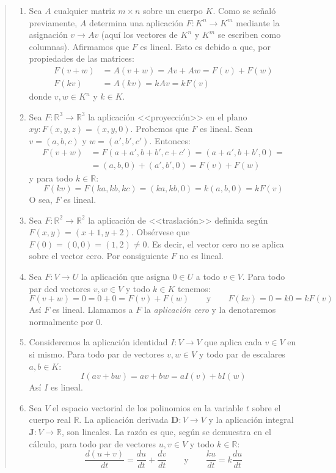 \begin{quote}
  \begin{enumerate}[label=\alph*.]
    \item Sea \(A\) cualquier matriz \(m \times n\) sobre un cuerpo \(K\). Como se señaló previamente, \(A\) determina una aplicación \(F:K^n \rightarrow K^m\) mediante la asignación \(v \rightarrow Av\) (aquí los vectores de \(K^n\) y \(K^m\) se escriben como columnas). Afirmamos que \(F\) es lineal. Esto es debido a que, por propiedades de las matrices:
    \begin{align*}
      F(v + w) &= A(v+w) = Av + Aw = F(v) + F(w) \\
      F(kv) &= A(kv) = kAv = kF(v)
    \end{align*}
    donde \(v, w \in K^n\) y \(k \in K\).
    \item Sea \(F:\mathbb{R}^3 \rightarrow \mathbb{R}^3\) la aplicación <<proyección>> en el plano \(xy: F(x,y,z)= (x,y,0)\). Probemos que \(F\) es lineal. Sean \(v=(a,b,c)\) y \(w=(a',b',c')\). Entonces:
    \begin{align*}
      F(v+w) &= F(a+a', b+b', c+c') = (a+a', b+b',0) = \\
            &= (a,b,0) + (a',b',0) = F(v) + F(w)
    \end{align*}
    y para todo \(k \in \mathbb{R}\):
    \[
      F(kv) = F(ka,kb,kc) = (ka,kb,0) = k(a,b,0) = kF(v)
    \]
    O sea, \(F\) es lineal.
    \item Sea \(F: \mathbb{R}^2 \rightarrow \mathbb{R}^2\) la aplicación de <<traslación>> definida según \(F(x,y) = (x+1,y+2)\). Obsérvese que \(F(0)=(0,0)=(1,2)\neq 0\). Es decir, el vector cero no se aplica sobre el vector cero. Por consiguiente \(F\) no es lineal.
    \item Sea \(F:V\rightarrow U\) la aplicación que asigna \(0 \in U\) a todo \(v \in V\). Para todo par ded vectores \(v,w \in V\) y todo \(k \in K\) tenemos:
    \[
      F(v+w) = 0 = 0+0 = F(v) + F(w) \qquad \text{y} \qquad F(kv) = 0 = k0 = kF(v)
    \]
    Así \(F\) es lineal. Llamamos a \(F\) la \textit{aplicación cero} y la denotaremos normalmente por \(0\).
    \item Consideremos la aplicación identidad \(I:V\rightarrow V\) que aplica cada \(v\in V\) en si mismo. Para todo par de vectores \(v, w \in V\) y todo par de escalares \(a,b \in K\):
    \[
      I(av+bw)= av + bw = aI(v) + bI(w)
    \]
    Así \(I\) es lineal.
    \item Sea \(V\) el espacio vectorial de los polinomios en la variable \(t\) sobre el cuerpo real \(\mathbb{R}\). La aplicación derivada \(\mathbf{D}:V\rightarrow V\) y la aplicación integral \(\mathbf{J}:V\rightarrow \mathbb{R}\), son lineales. La razón es que, según se demuestra en el cálculo, para todo par de vectores \(u,v \in V\) y todo \(k\in \mathbb{R}\):
    \[
      \frac{d(u+v)}{dt} = \frac{du}{dt} + \frac{dv}{dt} \qquad \text{y} \qquad \frac{ku}{dt} = k\frac{du}{dt}
    \]
  \end{enumerate}
 \end{quote}

